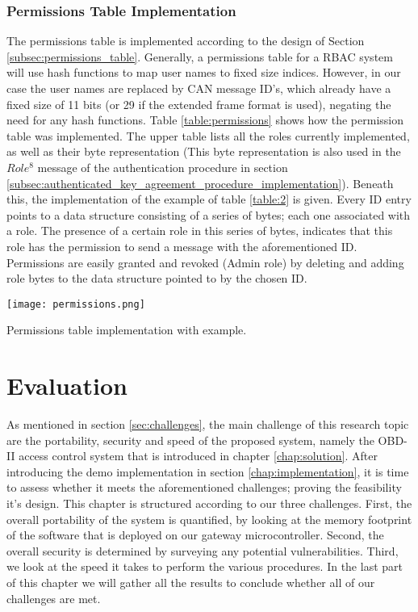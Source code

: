 \subsubsection{Permissions Table Implementation}
\label{subsec:permissions_table_implementation}

The permissions table is implemented according to the design of Section \ref{subsec:permissions_table}. Generally, a permissions table for a RBAC system will use hash functions to map user names to fixed size indices. However, in our case the user names are replaced by CAN message ID's, which already have a fixed size of 11 bits (or 29 if the extended frame format is used), negating the need for any hash functions. Table \ref{table:permissions} shows how the permission table was implemented. The upper table lists all the roles currently implemented, as well as their byte representation (This byte representation is also used in the $Role^{8}$ message of the authentication procedure in section \ref{subsec:authenticated_key_agreement_procedure_implementation}). Beneath this, the implementation of the example of table \ref{table:2} is given. Every ID entry points to a data structure consisting of a series of bytes; each one associated with a role. The presence of a certain role in this series of bytes, indicates that this role has the permission to send a message with the aforementioned ID. Permissions are easily granted and revoked (Admin role) by deleting and adding role bytes to the data structure pointed to by the chosen ID. 

\begin{table}[h]
	\label{table:permissions}
	\centering
	\texttt{[image: permissions.png]}
	\caption{Permissions table implementation with example.}
\end{table}


\section{Evaluation}
\label{chap:evaluation}

As mentioned in section \ref{sec:challenges}, the main challenge of this research topic are the portability, security and speed of the proposed system, namely the OBD-II access control system that is introduced in chapter \ref{chap:solution}. After introducing the demo implementation in section \ref{chap:implementation}, it is time to assess whether it meets the aforementioned challenges; proving the feasibility it's design. This chapter is structured according to our three challenges. First, the overall portability of the system is quantified, by looking at the memory footprint of the software that is deployed on our gateway microcontroller. Second, the overall security is determined by surveying any potential vulnerabilities. Third, we look at the speed it takes to perform the various procedures. In the last part of this chapter we will gather all the results to conclude whether all of our challenges are met.   

